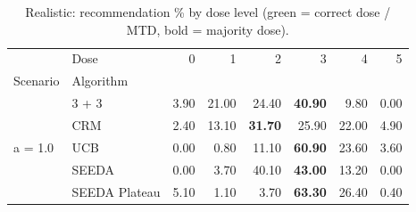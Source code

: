 \begin{table}[H]
\centering
\caption{Realistic: recommendation \% by dose level (green = correct dose / MTD, bold = majority dose).}
\label{tab:real_rec_by_dose}
\begin{tabular}{llrrrrrr}
\toprule
 & Dose & 0 & 1 & 2 & 3 & 4 & 5 \\
Scenario & Algorithm &  &  &  &  &  &  \\
\midrule
\multirow[c]{5}{*}{a = 1.0} & 3 + 3 & 3.90 & 21.00 & {\cellcolor[HTML]{C8E6C9}} 24.40 & \bfseries 40.90 & 9.80 & 0.00 \\
 & CRM & 2.40 & 13.10 & {\cellcolor[HTML]{C8E6C9}} \bfseries 31.70 & 25.90 & 22.00 & 4.90 \\
 & UCB & 0.00 & 0.80 & {\cellcolor[HTML]{C8E6C9}} 11.10 & \bfseries 60.90 & 23.60 & 3.60 \\
 & SEEDA & 0.00 & 3.70 & {\cellcolor[HTML]{C8E6C9}} 40.10 & \bfseries 43.00 & 13.20 & 0.00 \\
 & SEEDA Plateau & 5.10 & 1.10 & {\cellcolor[HTML]{C8E6C9}} 3.70 & \bfseries 63.30 & 26.40 & 0.40 \\
\bottomrule
\end{tabular}
\end{table}
